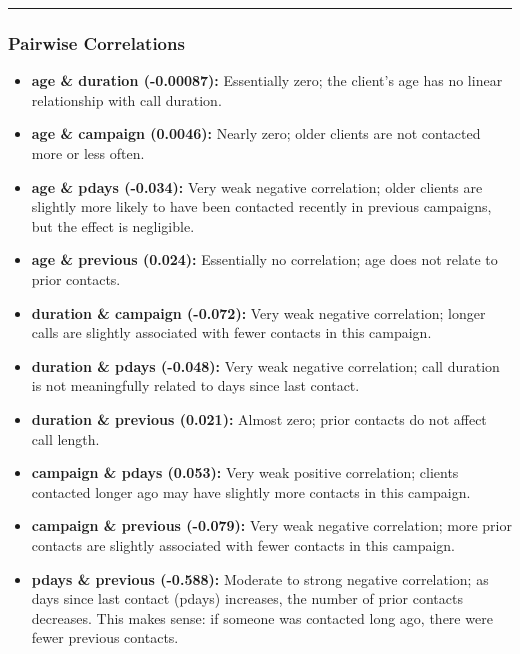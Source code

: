 \documentclass[
]{article}
\begin{document}
\begin{center}\rule{0.5\linewidth}{0.5pt}\end{center}

\subsubsection{Pairwise Correlations}\label{pairwise-correlations}

\begin{itemize}
\item
  \textbf{age \& duration (-0.00087):} Essentially zero; the client's
  age has no linear relationship with call duration.\\
\item
  \textbf{age \& campaign (0.0046):} Nearly zero; older clients are not
  contacted more or less often.\\
\item
  \textbf{age \& pdays (-0.034):} Very weak negative correlation; older
  clients are slightly more likely to have been contacted recently in
  previous campaigns, but the effect is negligible.\\
\item
  \textbf{age \& previous (0.024):} Essentially no correlation; age does
  not relate to prior contacts.
\item
  \textbf{duration \& campaign (-0.072):} Very weak negative
  correlation; longer calls are slightly associated with fewer contacts
  in this campaign.\\
\item
  \textbf{duration \& pdays (-0.048):} Very weak negative correlation;
  call duration is not meaningfully related to days since last
  contact.\\
\item
  \textbf{duration \& previous (0.021):} Almost zero; prior contacts do
  not affect call length.
\item
  \textbf{campaign \& pdays (0.053):} Very weak positive correlation;
  clients contacted longer ago may have slightly more contacts in this
  campaign.\\
\item
  \textbf{campaign \& previous (-0.079):} Very weak negative
  correlation; more prior contacts are slightly associated with fewer
  contacts in this campaign.
\item
  \textbf{pdays \& previous (-0.588):} Moderate to strong negative
  correlation; as days since last contact (pdays) increases, the number
  of prior contacts decreases. This makes sense: if someone was
  contacted long ago, there were fewer previous contacts.
\end{itemize}
\end{document}
